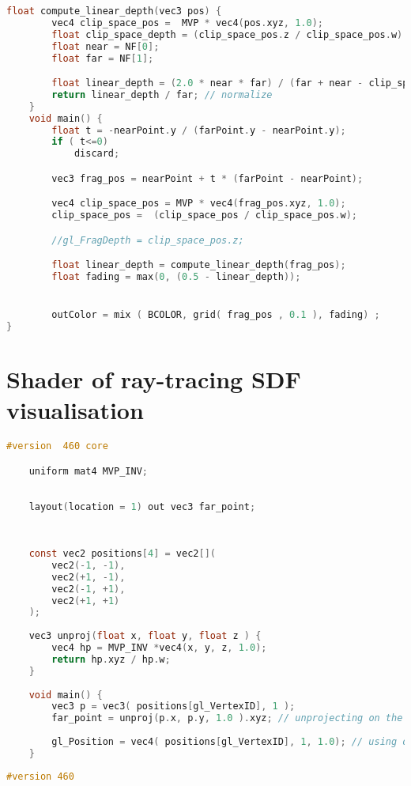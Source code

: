 \begin{appendices}
\begin{lstlisting}[language=C, caption = Fragment shader of Infinity Grids Scene]
	float compute_linear_depth(vec3 pos) {
		vec4 clip_space_pos =  MVP * vec4(pos.xyz, 1.0);
		float clip_space_depth = (clip_space_pos.z / clip_space_pos.w) * 2.0 - 1.0; // put back between -1 and 1
		float near = NF[0];
		float far = NF[1];

		float linear_depth = (2.0 * near * far) / (far + near - clip_space_depth * (far - near)); // get linear value between 0.01 and 100
		return linear_depth / far; // normalize
	}
	void main() {
		float t = -nearPoint.y / (farPoint.y - nearPoint.y);
		if ( t<=0)
			discard;

		vec3 frag_pos = nearPoint + t * (farPoint - nearPoint);

		vec4 clip_space_pos = MVP * vec4(frag_pos.xyz, 1.0);
		clip_space_pos =  (clip_space_pos / clip_space_pos.w);

		//gl_FragDepth = clip_space_pos.z;

		float linear_depth = compute_linear_depth(frag_pos);
		float fading = max(0, (0.5 - linear_depth));


		outColor = mix ( BCOLOR, grid( frag_pos , 0.1 ), fading) ;
}
\end{lstlisting}

\chapter{Shader of ray-tracing SDF visualisation}

\begin{lstlisting}[language=C, caption = Vertex shader of ray-tracing SDF visualisation]
	#version  460 core

	uniform mat4 MVP_INV;
	
	
	layout(location = 1) out vec3 far_point;
	
	
	
	const vec2 positions[4] = vec2[](
		vec2(-1, -1),
		vec2(+1, -1),
		vec2(-1, +1),
		vec2(+1, +1)
	);
	
	vec3 unproj(float x, float y, float z ) {
		vec4 hp = MVP_INV *vec4(x, y, z, 1.0);  
		return hp.xyz / hp.w;
	}
	
	void main() {
		vec3 p = vec3( positions[gl_VertexID], 1 ); 
		far_point = unproj(p.x, p.y, 1.0 ).xyz; // unprojecting on the far plane
		
		gl_Position = vec4( positions[gl_VertexID], 1, 1.0); // using directly the clipped coordinates
	}
\end{lstlisting}

\clearpage

\begin{lstlisting}[language=C, caption = Fragment shader of ray-tracing SDF visualisation]
	#version 460


\end{lstlisting}
\end{appendices}
